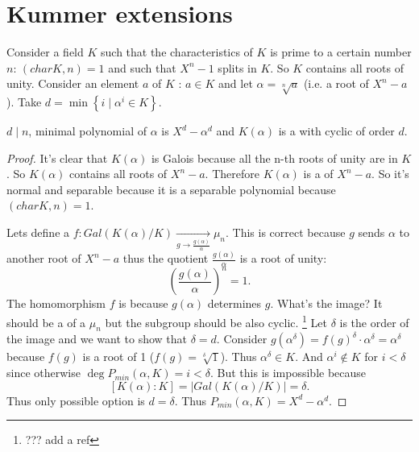 \section{Kummer extensions}

Consider a field $K$ such that the characteristics of $K$ is prime to
a certain number $n$: $\left(char K, n\right) = 1$ and such that $X^n
- 1$ splits in $K$. So $K$ contains all roots of unity. Consider an
element $a$ of $K$ : $a \in K$ and let $\alpha = \sqrt[n]{a}$ (i.e. a
root of $X^n - a$). Take $d = \min{\left\{ i \mid \alpha^i \in
  K\right\}}$.

\begin{proposition}
  $d \mid n$, minimal polynomial of $\alpha$ is $X^d - \alpha^d$ and
  $K\left(\alpha\right)$ is a  with
  cyclic  of order $d$.
  \begin{proof}
    It's clear that $K\left(\alpha\right)$ is Galois because all the
    n-th roots of unity are in $K$. So $K\left(\alpha\right)$
    contains all roots of $X^n - a$. Therefore $K\left(\alpha\right)$
    is a  of $X^n - a$. So it's normal and
    separable because it is a separable polynomial because $\left(char
    K, n\right) = 1$.

    Lets define a 
    $f: Gal\left(K\left(\alpha\right)/K\right) \xrightarrow[g \to
      \frac{g\left(\alpha\right)}{\alpha}]{} \mu_n$. This is correct
    because $g$ sends $\alpha$ to another root of $X^n - a$ thus the
    quotient $\frac{g\left(\alpha\right)}{\alpha}$ is a root of unity:
    \[
    \left(\frac{g\left(\alpha\right)}{\alpha}\right)^n = 1.
    \]
    The homomorphism $f$ is  because
    $g\left(\alpha\right)$ determines $g$. What's the image? It should
    be a  of a  $\mu_n$
    but the subgroup should be also cyclic.
    \footnote{
      ??? add a ref
    }
    Let $\delta$ is the order of the image and we want to show that
    $\delta = d$. Consider
    $g\left(\alpha^\delta\right) = f\left(g\right)^\delta \cdot
    \alpha^\delta = \alpha^\delta$ because $f\left(g\right)$ is a root
    of 1 ($f\left(g\right) = \sqrt[\delta]{1}$). Thus $\alpha^\delta
    \in K$. And $\alpha^i \notin K$ for $i < \delta$ since otherwise
    $\deg P_{min}\left(\alpha, K\right) = i < \delta$. But this is
    impossible because
    \[
    \left[K\left(\alpha\right):K\right] =
    \left|Gal\left(K\left(\alpha\right)/K\right)\right| = \delta.
    \]
    Thus only possible option is $d = \delta$. Thus
    $P_{min}\left(\alpha, K\right) = X^d - \alpha^d$.
  \end{proof}
  \label{prop:lec7_1}
\end{proposition}

